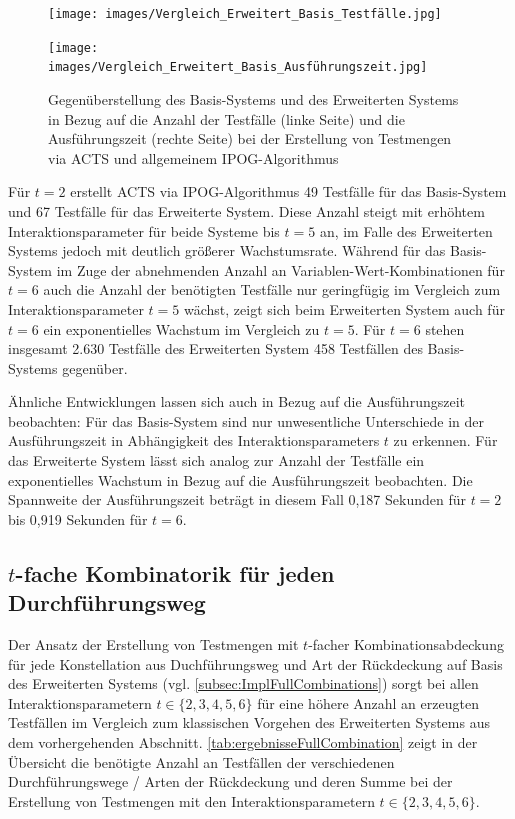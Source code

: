 \begin{figure}[!htb]
\centering
\begin{minipage}{.5\textwidth}
  \centering
  \texttt{[image: images/Vergleich\_Erweitert\_Basis\_Testfälle.jpg]}
\end{minipage}%
\begin{minipage}{.5\textwidth}
  \centering
  \texttt{[image: images/Vergleich\_Erweitert\_Basis\_Ausführungszeit.jpg]}
\end{minipage}
\caption{Gegenüberstellung des Basis-Systems und des Erweiterten Systems in Bezug auf die Anzahl der Testfälle (linke Seite) und die Ausführungszeit (rechte Seite) bei der Erstellung von Testmengen via ACTS und allgemeinem IPOG-Algorithmus}
\label{fig:vergleichSimpleComplex}

\end{figure}

Für $t=2$ erstellt ACTS via IPOG-Algorithmus 49 Testfälle für das Basis-System und 67 Testfälle für das Erweiterte System. Diese Anzahl steigt mit erhöhtem Interaktionsparameter für beide Systeme bis $t=5$ an, im Falle des Erweiterten Systems jedoch mit deutlich größerer Wachstumsrate. Während für das Basis-System im Zuge der abnehmenden Anzahl an Variablen-Wert-Kombinationen für $t=6$ auch die Anzahl der benötigten Testfälle nur geringfügig im Vergleich zum Interaktionsparameter $t=5$ wächst, zeigt sich beim Erweiterten System auch für $t=6$ ein exponentielles Wachstum im Vergleich zu $t=5$. Für $t=6$ stehen insgesamt 2.630 Testfälle des Erweiterten System 458 Testfällen des Basis-Systems gegenüber.

Ähnliche Entwicklungen lassen sich auch in Bezug auf die Ausführungszeit beobachten: Für das Basis-System sind nur unwesentliche Unterschiede in der Ausführungszeit in Abhängigkeit des Interaktionsparameters $t$ zu erkennen. Für das Erweiterte System lässt sich analog zur Anzahl der Testfälle ein exponentielles Wachstum in Bezug auf die Ausführungszeit beobachten. Die Spannweite der Ausführungszeit beträgt in diesem Fall 0,187 Sekunden für $t=2$ bis 0,919 Sekunden für $t=6$. 


\subsection{$t$-fache Kombinatorik für jeden Durchführungsweg}\label{subsec:resultsFullCombinations}

Der Ansatz der Erstellung von Testmengen mit $t$-facher Kombinationsabdeckung für jede Konstellation aus Duchführungsweg und Art der Rückdeckung auf Basis des Erweiterten Systems (vgl. \autoref{subsec:ImplFullCombinations}) sorgt bei allen Interaktionsparametern $t \in \{2,3,4,5,6\}$ für eine höhere Anzahl an erzeugten Testfällen im Vergleich zum klassischen Vorgehen des Erweiterten Systems aus dem vorhergehenden Abschnitt. \autoref{tab:ergebnisseFullCombination} zeigt in der Übersicht die benötigte Anzahl an Testfällen der verschiedenen Durchführungswege / Arten der Rückdeckung und deren Summe bei der Erstellung von Testmengen mit den Interaktionsparametern $t \in \{2,3,4,5,6\}$.

